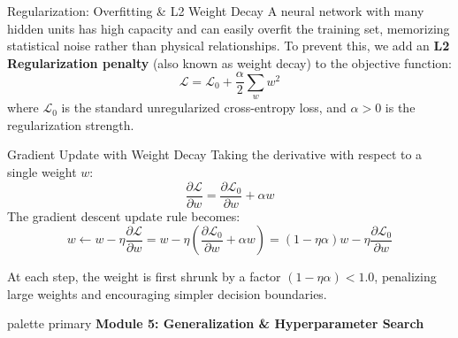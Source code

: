 \documentclass[9pt]{beamer}
\begin{document}
\begin{frame}{Regularization: Overfitting \& L2 Weight Decay}
  A neural network with many hidden units has high capacity and can easily overfit the training set, memorizing statistical noise rather than physical relationships.
  To prevent this, we add an \textbf{L2 Regularization penalty} (also known as weight decay) to the objective function:
  $$\mathcal{L} = \mathcal{L}_0 + \frac{\alpha}{2} \sum_{w} w^2$$
  where $\mathcal{L}_0$ is the standard unregularized cross-entropy loss, and $\alpha > 0$ is the regularization strength.
  \begin{block}{Gradient Update with Weight Decay}
    Taking the derivative with respect to a single weight $w$:
    $$\frac{\partial \mathcal{L}}{\partial w} = \frac{\partial \mathcal{L}_0}{\partial w} + \alpha w$$
    The gradient descent update rule becomes:
    $$w \leftarrow w - \eta \frac{\partial \mathcal{L}}{\partial w} = w - \eta \left( \frac{\partial \mathcal{L}_0}{\partial w} + \alpha w \right) = (1 - \eta \alpha) w - \eta \frac{\partial \mathcal{L}_0}{\partial w}$$
  \end{block}
  At each step, the weight is first shrunk by a factor $(1 - \eta \alpha) < 1.0$, penalizing large weights and encouraging simpler decision boundaries.
\end{frame}

\begin{frame}[plain]
  \vfill
  \centering
  \begin{beamercolorbox}[sep=8pt,center,shadow=true,rounded=true]{palette primary}
    \textbf{Module 5: Generalization \& Hyperparameter Search}
  \end{beamercolorbox}
  \vfill
\end{frame}
\end{document}
